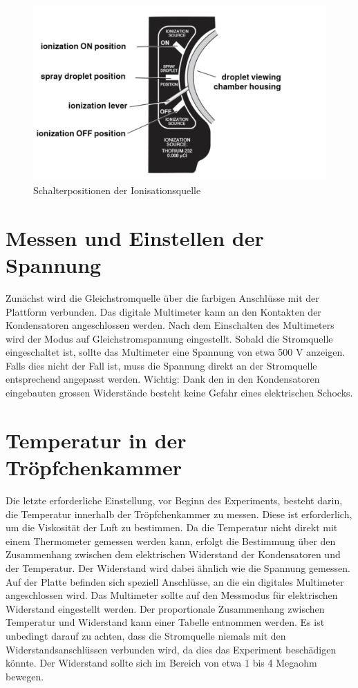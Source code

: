 \begin{figure}[ht]
	\begin{center}
		\includegraphics[scale=0.5]{bilder/pdf/Schalterfunktionen.pdf}
		\caption{Schalterpositionen der Ionisationsquelle \parencite[6]{instructionManualHalogen}}
		\label{fig:Schalterpositionen}
	\end{center}
\end{figure}

\section{Messen und Einstellen der Spannung}\label{sec:spannung}
Zunächst wird die Gleichstromquelle über die farbigen Anschlüsse mit der Plattform verbunden. Das digitale Multimeter kann an den Kontakten der Kondensatoren angeschlossen werden. Nach dem Einschalten des Multimeters wird der Modus auf Gleichstromspannung eingestellt. Sobald die Stromquelle eingeschaltet ist, sollte das Multimeter eine Spannung von etwa 500 V anzeigen. Falls dies nicht der Fall ist, muss die Spannung direkt an der Stromquelle entsprechend angepasst werden. Wichtig: Dank den in den Kondensatoren eingebauten grossen Widerstände besteht keine Gefahr eines elektrischen Schocks.

\section{Temperatur in der Tröpfchenkammer}\label{sec:Temperatur}
Die letzte erforderliche Einstellung, vor Beginn des Experiments, besteht darin, die Temperatur innerhalb der Tröpfchenkammer zu messen. Diese ist erforderlich, um die Viskosität der Luft zu bestimmen. Da die Temperatur nicht direkt mit einem Thermometer gemessen werden kann, erfolgt die Bestimmung über den Zusammenhang zwischen dem elektrischen Widerstand der Kondensatoren und der Temperatur. Der Widerstand wird dabei ähnlich wie die Spannung gemessen. Auf der Platte befinden sich speziell Anschlüsse, an die ein digitales Multimeter angeschlossen wird. Das Multimeter sollte auf den Messmodus für elektrischen Widerstand eingestellt werden. Der proportionale Zusammenhang zwischen Temperatur und Widerstand kann einer Tabelle entnommen werden. Es ist unbedingt darauf zu achten, dass die Stromquelle niemals mit den Widerstandsanschlüssen verbunden wird, da dies das Experiment beschädigen könnte. Der Widerstand sollte sich im Bereich von etwa 1 bis 4 Megaohm bewegen.

